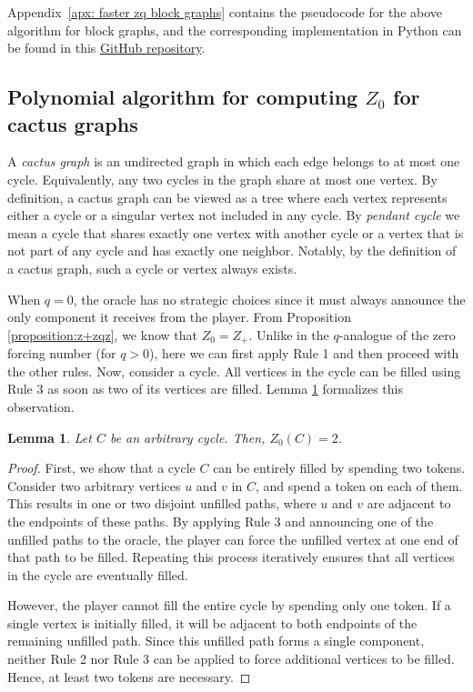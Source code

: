 \documentclass[11pt]{article}
\theoremstyle{plain}
\newtheorem{lemma}[theorem]{Lemma}
\theoremstyle{definition}
\theoremstyle{remark}
\begin{document}
Appendix~\ref{apx: faster zq block graphs} contains the pseudocode for the above algorithm for block graphs, and the corresponding implementation in Python can be found in this \href{https://github.com/sanazmgh/Zq-Forcing-Number-Algorithms}{GitHub repository}.



\subsection{Polynomial algorithm for computing \texorpdfstring{\(Z_0\)}{Z0} for cactus graphs}\label{sec:polyalgocactusgraphs}

A \textit{cactus graph} is an undirected graph in which each edge belongs to at most one cycle. Equivalently, any two cycles in the graph share at most one vertex. By definition, a cactus graph can be viewed as a tree where each vertex represents either a cycle or a singular vertex not included in any cycle. By \textit{pendant cycle} we mean a cycle that shares exactly one vertex with another cycle or a vertex that is not part of any cycle and has exactly one neighbor. Notably, by the definition of a cactus graph, such a cycle or vertex always exists.

When $q=0$, the oracle has no strategic choices since it must always announce the only component it receives from the player. From Proposition \ref{proposition:z+zqz}, we know that $Z_0 = Z_+$. Unlike in the $q$-analogue of the zero forcing number (for $q > 0$), here we can first apply Rule 1 and then proceed with the other rules. Now, consider a cycle. All vertices in the cycle can be filled using Rule 3 as soon as two of its vertices are filled. Lemma \ref{lemma:cycle} formalizes this observation.

\begin{lemma} \label{lemma:cycle}
    Let $C$ be an arbitrary cycle. Then, $Z_0(C) = 2$.
\end{lemma}

\begin{proof}
    First, we show that a cycle $C$ can be entirely filled by spending two tokens. Consider two arbitrary vertices $u$ and $v$ in $C$, and spend a token on each of them. This results in one or two disjoint unfilled paths, where $u$ and $v$ are adjacent to the endpoints of these paths. By applying Rule 3 and announcing one of the unfilled paths to the oracle, the player can force the unfilled vertex at one end of that path to be filled. Repeating this process iteratively ensures that all vertices in the cycle are eventually filled.

    However, the player cannot fill the entire cycle by spending only one token. If a single vertex is initially filled, it will be adjacent to both endpoints of the remaining unfilled path. Since this unfilled path forms a single component, neither Rule 2 nor Rule 3 can be applied to force additional vertices to be filled. Hence, at least two tokens are necessary.
\end{proof}
\end{document}
